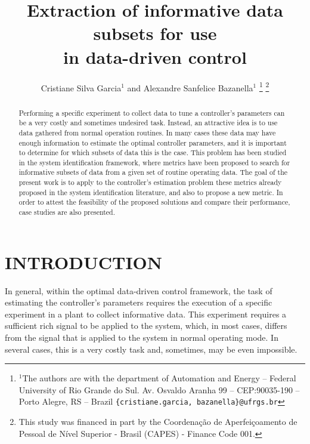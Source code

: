 \documentclass[letterpaper, 10 pt, conference]{ieeeconf}  %
\title{\LARGE \bf
Extraction of informative data subsets for use \\ in data-driven control
}
\author{Cristiane Silva Garcia$^{1}$ and Alexandre Sanfelice Bazanella$^{1}$%
\thanks{$^{1}$The authors are with the department of Automation and Energy -- Federal University of Rio Grande do Sul. Av. Osvaldo Aranha 99 -- CEP:90035-190 -- Porto Alegre, RS -- Brazil
        {\tt\small \{cristiane.garcia, bazanella\}@ufrgs.br}}%
\thanks{This study was financed in part by the Coordena\c{c}\~{a}o de Aperfei\c{c}oamento de Pessoal de N\'{i}vel Superior - Brasil (CAPES) - Finance Code 001.}
}
\begin{document}


\maketitle
\thispagestyle{empty}
\pagestyle{empty}


\begin{abstract}


Performing a specific experiment to collect data to tune a controller's parameters can be a very costly and sometimes undesired task.
Instead, an attractive idea is to use data gathered from normal operation routines. In many cases these data may have enough information to estimate the optimal controller parameters, and it is important to determine for which subsets of data this is the case.
This problem has been studied in the system identification framework, where metrics have been proposed to search for informative subsets of data from a given set of routine operating data. The goal of the present work is to apply to the controller's estimation problem these metrics already proposed in the system identification literature, and also to propose a new metric. In order to attest the feasibility of the proposed solutions and compare their performance, case studies are also presented.


\end{abstract}

\section{INTRODUCTION}


In general, within the optimal data-driven control framework, the task of estimating the controller's parameters requires the execution of a specific experiment in a plant to collect informative data.
This experiment requires a sufficient rich signal to be applied to the system, which, in most cases, differs from the signal that is applied to the system in normal operating mode.
In several cases, this is a very costly task and, sometimes, may be even impossible.
\end{document}
